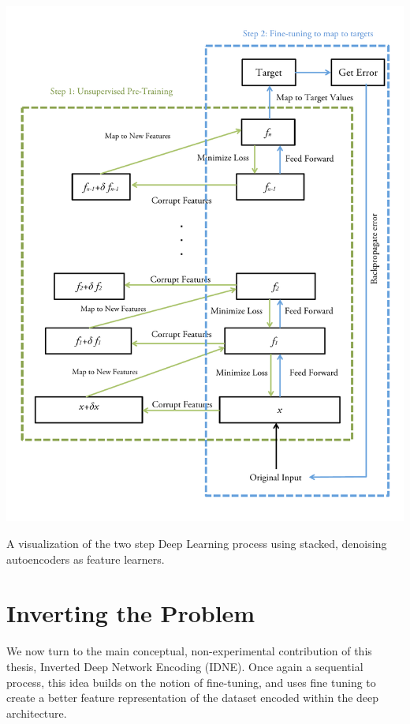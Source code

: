 \begin{FPfigure} 
\begin{center} 
\includegraphics[width=1.2\textwidth]{figures/deeplearning.pdf}
\caption[Short figure name.]{A visualization of the two step Deep Learning process using stacked, denoising autoencoders as feature learners. \label{fig:deeplearning}}
\end{center}
\end{FPfigure}
\afterpage{\clearpage}

\section{Inverting the Problem}

We now turn to the main conceptual, non-experimental contribution of this thesis, Inverted Deep Network Encoding (IDNE). Once again a sequential process, this idea builds on the notion of fine-tuning, and uses fine tuning to create a better feature representation of the dataset encoded within the deep architecture. 

